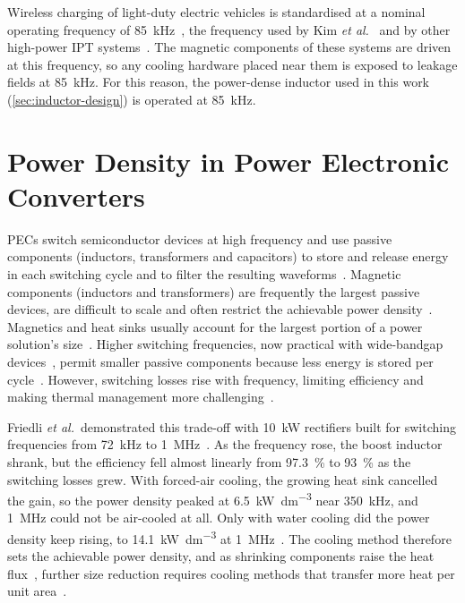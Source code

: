 Wireless charging of light-duty electric vehicles is standardised at a nominal
operating frequency of \SI{85}{\kilo\hertz}~\cite{society_of_automotive_engineers_r_2024},
the frequency used by Kim \emph{et al.}~\cite{kim_thermal_2022} and by
other high-power IPT systems~\cite{bosshard_multi-objective_2016}.
The magnetic components of these systems are driven at this frequency, so any
cooling hardware placed near them is exposed to leakage fields at \SI{85}{\kilo\hertz}. 
For this reason, the power-dense inductor used in this work (\cref{sec:inductor-design}) is
operated at \SI{85}{\kilo\hertz}.

\section{Power Density in Power Electronic Converters}
\label{sec:motivation}

PECs switch semiconductor devices at high frequency and use passive components 
(inductors, transformers and capacitors) to store and release energy in
each switching cycle and to filter the resulting
waveforms~\cite{morroni_understanding_2023}. Magnetic components (inductors and transformers) are frequently the
largest passive devices, are difficult to scale and often restrict the
achievable power density~\cite{biela_cooling_2007,morroni_understanding_2023,sullivan_size_2016}. 
Magnetics and heat sinks usually account for the largest portion of a power solution's
size~\cite{biela_cooling_2007,morroni_understanding_2023}. 
Higher switching frequencies, now practical with wide-bandgap
devices~\cite{gao_modeling_2022}, permit smaller passive components because
less energy is stored per cycle~\cite{morroni_understanding_2023}. However,
switching losses rise with frequency, limiting efficiency and making thermal
management more challenging~\cite{friedli_essence_2014}.

Friedli \emph{et al.}\ demonstrated this trade-off with \SI{10}{\kilo\watt}
rectifiers built for switching frequencies from \SI{72}{\kilo\hertz} to
\SI{1}{\mega\hertz}~\cite{friedli_essence_2014}. As the frequency rose, the
boost inductor shrank, but the efficiency fell almost linearly from
\SI{97.3}{\percent} to \SI{93}{\percent} as the switching losses grew. With
forced-air cooling, the growing heat sink cancelled the gain, so the power
density peaked at \SI{6.5}{\kilo\watt\per\deci\metre\cubed} near
\SI{350}{\kilo\hertz}, and \SI{1}{\mega\hertz} could not be air-cooled at all.
Only with water cooling did the power density keep rising, to
\SI{14.1}{\kilo\watt\per\deci\metre\cubed} at
\SI{1}{\mega\hertz}~\cite{friedli_essence_2014}. The cooling method therefore
sets the achievable power density, and as shrinking components raise the heat
flux~\cite{morroni_understanding_2023}, further size reduction requires cooling
methods that transfer more heat per unit area~\cite{biela_cooling_2007}.

